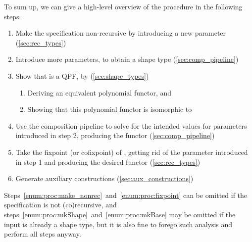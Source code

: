 To sum up, we can give a high-level overview of the procedure in the following steps.
\begin{enumerate}
  \item\label{enum:proc:make_nonrec}
    Make the specification non-recursive by introducing a new parameter (\cref{sec:rec_types})
  \item\label{enum:proc:mkShape} 
    Introduce more parameters, to obtain a shape type  (\cref{sec:comp_pipeline})
  \item\label{enum:proc:mkQpf} 
    Show that  is a QPF, by (\cref{sec:shape_types})
        \begin{enumerate}
          \item Deriving an equivalent polynomial functor, and
          \item Showing that this polynomial functor is isomorphic to 
        \end{enumerate}
  \item\label{enum:proc:mkBase} 
    Use the composition pipeline to solve for the intended values for parameters introduced in step 2, producing the  functor (\cref{sec:comp_pipeline})
  \item\label{enum:proc:fixpoint} 
    Take the fixpoint (or cofixpoint) of , getting rid of the parameter introduced in step 1 
    and producing the desired functor (\cref{sec:rec_types})
  \item\label{enum:proc:aux} 
    Generate auxiliary constructions (\cref{sec:aux_constructions})
\end{enumerate}

Steps~\ref{enum:proc:make_nonrec}~and~\ref{enum:proc:fixpoint} can be omitted if the specification is not (co)recursive, and steps~\ref{enum:proc:mkShape}~and~\ref{enum:proc:mkBase} may be omitted
if the input is already a shape type, but it is also fine to forego such analysis and perform all steps anyway.


